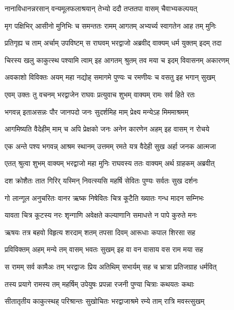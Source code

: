 \twolineshloka
{नानाविधानन्नरसान् वन्यमूलफलाश्रयान्}
{तेभ्यो ददौ तप्ततपा वासम् चैवाभ्यकल्पयत्} %

\twolineshloka
{मृग पक्षिभिर् आसीनो मुनिभिः च समन्ततः}
{रामम् आगतम् अभ्यर्च्य स्वागतेन आह तम् मुनिः} %

\twolineshloka
{प्रतिगृह्य च ताम् अर्चाम् उपविष्टम् स राघवम्}
{भरद्वाजो अब्रवीद् वाक्यम् धर्म युक्तम् इदम् तदा} %

\twolineshloka
{चिरस्य खलु काकुत्स्थ पश्यामि त्वाम् इह आगतम्}
{श्रुतम् तव मया च इदम् विवासनम् अकारणम्} %

\twolineshloka
{अवकाशो विविक्तः अयम् महा नद्योह् समागमे}
{पुण्यः च रमणीयः च वसतु इह भगान् सुखम्} %

\twolineshloka
{एवम् उक्तः तु वचनम् भरद्वाजेन राघवः}
{प्रत्युवाच शुभम् वाक्यम् रामः सर्व हिते रतः} %

\twolineshloka
{भगवन्न् इताअसन्नः पौर जानपदो जनः}
{सुदर्शमिह माम् प्रेक्ष्य मन्येऽह मिममाश्रमम्} %

\twolineshloka
{आगमिष्यति वैदेहीम् माम् च अपि प्रेक्षको जनः}
{अनेन कारणेन अहम् इह वासम् न रोचये} %

\twolineshloka
{एक अन्ते पश्य भगवन्न् आश्रम स्थानम् उत्तमम्}
{रमते यत्र वैदेही सुख अर्हा जनक आत्मजा} %

\twolineshloka
{एतत् श्रुत्वा शुभम् वाक्यम् भरद्वाजो महा मुनिः}
{राघवस्य ततः वाक्यम् अर्थ ग्राहकम् अब्रवीत्} %

\twolineshloka
{दश क्रोशैतः तात गिरिर् यस्मिन् निवत्स्यसि}
{महर्षि सेवितः पुण्यः सर्वतः सुख दर्शनः} %

\twolineshloka
{गो लान्गूल अनुचरितः वानर ऋष्क निषेवितः}
{चित्र कूटैति ख्यातः गन्ध मादन सम्निभः} %

\twolineshloka
{यावता चित्र कूटस्य नरः शृन्गाणि अवेक्षते}
{कल्याणानि समाधत्ते न पापे कुरुते मनः} %

\twolineshloka
{ऋषयः तत्र बहवो विहृत्य शरदाम् शतम्}
{तपसा दिवम् आरूधाः कपाल शिरसा सह} %

\twolineshloka
{प्रविविक्तम् अहम् मन्ये तम् वासम् भवतः सुखम्}
{इह वा वन वासाय वस राम मया सह} %

\twolineshloka
{स रामम् सर्व कामैअः तम् भरद्वाजः प्रिय अतिथिम्}
{सभार्यम् सह च भ्रात्रा प्रतिजग्राह धर्मवित्} %

\twolineshloka
{तस्य प्रयागे रामस्य तम् महर्षिम् उपेयुषः}
{प्रपन्ना रजनी पुण्या चित्राः कथयतः कथाः} %

\twolineshloka
{सीतातृतीय काकुत्स्थह् परिश्रान्तः सुखोचितः}
{भरद्वाजाश्रमे रम्ये ताम् रात्रि मवस्त्सुखम्} %


